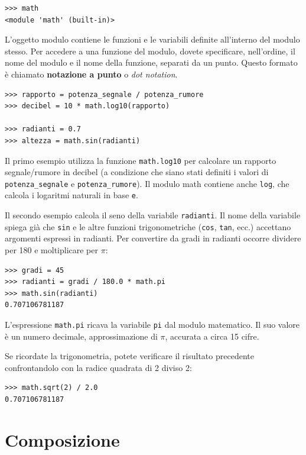 \documentclass[10pt]{book}
\begin{document}
\begin{verbatim}
>>> math
<module 'math' (built-in)>
\end{verbatim}
%
L'oggetto modulo contiene le funzioni e le variabili definite all'interno del modulo stesso. Per accedere a una funzione del modulo, dovete specificare, nell'ordine, il nome del modulo e il nome della funzione, separati da un punto. Questo formato è chiamato {\bf notazione a punto} o {\em dot notation}.

\begin{verbatim}
>>> rapporto = potenza_segnale / potenza_rumore
>>> decibel = 10 * math.log10(rapporto)

>>> radianti = 0.7
>>> altezza = math.sin(radianti)
\end{verbatim}
%
Il primo esempio utilizza la funzione \verb"math.log10" per calcolare un rapporto segnale/rumore in decibel (a condizione che siano stati definiti i valori di \verb"potenza_segnale" e \verb"potenza_rumore").  Il modulo math contiene anche {\tt log}, che calcola i logaritmi naturali in base {\tt e}.


Il secondo esempio calcola il seno della variabile {\tt radianti}. Il nome della variabile spiega già che {\tt sin} e le altre funzioni trigonometriche ({\tt cos}, {\tt tan}, ecc.) accettano argomenti espressi in radianti. Per convertire da gradi in radianti occorre dividere per 180 e moltiplicare per $\pi$:

\begin{verbatim}
>>> gradi = 45
>>> radianti = gradi / 180.0 * math.pi
>>> math.sin(radianti)
0.707106781187
\end{verbatim}
%
L'espressione {\tt math.pi} ricava la variabile {\tt pi} dal modulo matematico. Il suo valore è un numero decimale, approssimazione di $\pi$, accurata a circa 15 cifre. 

Se ricordate la trigonometria, potete verificare il risultato precedente confrontandolo con la radice quadrata di 2 diviso 2:

\begin{verbatim}
>>> math.sqrt(2) / 2.0
0.707106781187
\end{verbatim}
%

\section{Composizione}
\end{document}
